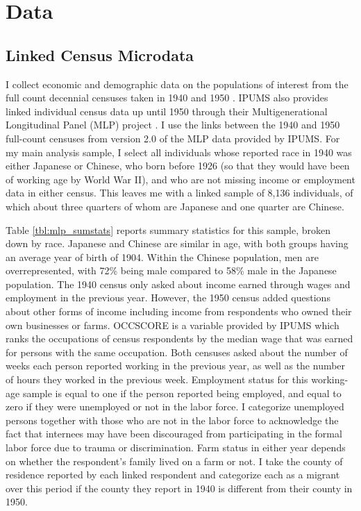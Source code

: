 \section{Data}
\subsection{Linked Census Microdata}\label{sec:data-IPUMS}

I collect economic and demographic data on the populations of interest 
from the full count decennial censuses taken in 1940 and 1950
\citep{rugglesIPUMSAncestryFull2024}.
IPUMS also provides linked individual census data up until 1950
through their Multigenerational Longitudinal Panel (MLP) project
\citep{rugglesIPUMSMultigenerationalLongitudinal2025}.
I use the links between the 1940 and 1950 full-count censuses
from version 2.0 of the MLP data provided by IPUMS.
For my main analysis sample,
I select all individuals 
whose reported race in 1940 was either Japanese or Chinese,
who born before 1926 (so that they would have been of working age by World War II),
and who are not missing income or employment data in either census.
This leaves me with a linked sample of 8,136 individuals,
of which about three quarters of whom are Japanese
and one quarter are Chinese.



Table \ref{tbl:mlp_sumstats} reports summary statistics for this sample,
broken down by race.
Japanese and Chinese are similar in age,
with both groups having an average year of birth of 1904.
Within the Chinese population, men are overrepresented,
with 72\% being male compared to 58\% male in the Japanese population.
The 1940 census only asked about income earned through wages and employment
in the previous year.
However, the 1950 census added questions about other forms of income
including income from respondents who owned their own businesses or farms.
OCCSCORE is a variable provided by IPUMS 
which ranks the occupations of census respondents 
by the median wage that was earned for persons with the same occupation.
Both censuses asked about the number of weeks each person reported working
in the previous year,
as well as the number of hours they worked in the previous week.
Employment status for this working-age sample
is equal to one if the person reported being employed,
and equal to zero if they were unemployed or not in the labor force.
I categorize unemployed persons 
together with those who are not in the labor force
to acknowledge the fact that internees may have been discouraged from
participating in the formal labor force due to trauma or discrimination.
Farm status in either year depends on whether the respondent's family
lived on a farm or not.
I take the county of residence reported by each linked respondent
and categorize each as a  migrant over this period
if the county they report in 1940 is different from their county in 1950.

